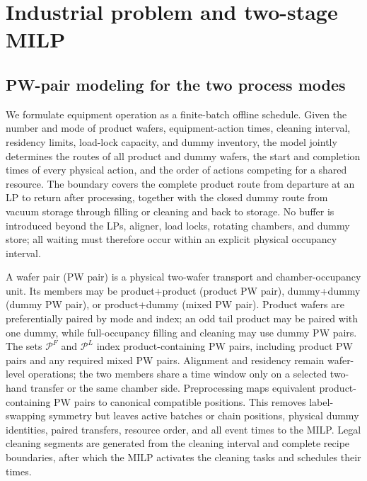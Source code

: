 \documentclass[final,5p,times,twocolumn]{elsarticle}
\begin{document}
\section{Industrial problem and two-stage MILP}
\setcounter{equation}{0}

\subsection{PW-pair modeling for the two process modes}

We formulate equipment operation as a finite-batch offline schedule. Given the number and mode of product wafers, equipment-action times, cleaning interval, residency limits, load-lock capacity, and dummy inventory, the model jointly determines the routes of all product and dummy wafers, the start and completion times of every physical action, and the order of actions competing for a shared resource. The boundary covers the complete product route from departure at an LP to return after processing, together with the closed dummy route from vacuum storage through filling or cleaning and back to storage. No buffer is introduced beyond the LPs, aligner, load locks, rotating chambers, and dummy store; all waiting must therefore occur within an explicit physical occupancy interval.

A wafer pair (PW pair) is a physical two-wafer transport and chamber-occupancy unit. Its members may be product+product (product PW pair), dummy+dummy (dummy PW pair), or product+dummy (mixed PW pair). Product wafers are preferentially paired by mode and index; an odd tail product may be paired with one dummy, while full-occupancy filling and cleaning may use dummy PW pairs. The sets $\mathcal P^F$ and $\mathcal P^L$ index product-containing PW pairs, including product PW pairs and any required mixed PW pairs. Alignment and residency remain wafer-level operations; the two members share a time window only on a selected two-hand transfer or the same chamber side. Preprocessing maps equivalent product-containing PW pairs to canonical compatible positions. This removes label-swapping symmetry but leaves active batches or chain positions, physical dummy identities, paired transfers, resource order, and all event times to the MILP. Legal cleaning segments are generated from the cleaning interval and complete recipe boundaries, after which the MILP activates the cleaning tasks and schedules their times.
\end{document}
